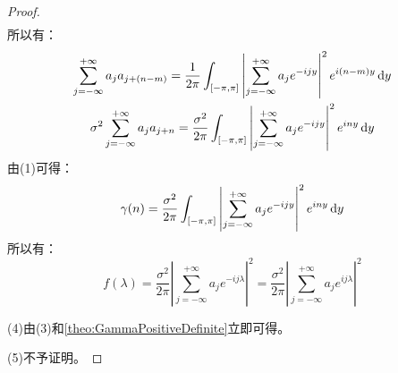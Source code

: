 \begin{proof}
\begin{align*}
	\end{align*}
	所以有：
	\begin{gather*}
		\sum_{j=-\infty}^{+\infty}a_ja_{j+(n-m)}=\frac{1}{2\pi}\int_{[-\pi,\pi]}\left|\sum_{j=-\infty}^{+\infty}a_je^{-ijy}\right|^2e^{i(n-m)y}\mathop{}\!\mathrm{d} y \\
		\sigma^2\sum_{j=-\infty}^{+\infty}a_ja_{j+n}=\frac{\sigma^2}{2\pi}\int_{[-\pi,\pi]}\left|\sum_{j=-\infty}^{+\infty}a_je^{-ijy}\right|^2e^{iny}\mathop{}\!\mathrm{d} y
	\end{gather*}
	由(1)可得：
	\begin{equation*}
		\gamma(n)=\frac{\sigma^2}{2\pi}\int_{[-\pi,\pi]}\left|\sum_{j=-\infty}^{+\infty}a_je^{-ijy}\right|^2e^{iny}\mathop{}\!\mathrm{d} y
	\end{equation*}
	所以有：
	\begin{equation*}
		f(\lambda)=\frac{\sigma^2}{2\pi}\left|\sum_{j=-\infty}^{+\infty}a_je^{-ij\lambda}\right|^2=\frac{\sigma^2}{2\pi}\left|\sum_{j=-\infty}^{+\infty}a_je^{ij\lambda}\right|^2
	\end{equation*}\par
	(4)由(3)和\cref{theo:GammaPositiveDefinite}立即可得。\par
	(5)不予证明。
\end{proof}









